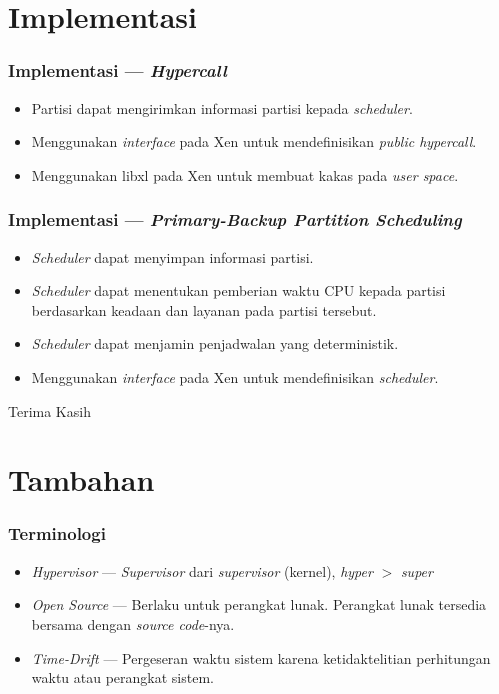 \documentclass[xetex]{beamer}
\begin{document}
\section{Implementasi}
\begin{frame}
	\frametitle{Implementasi --- \textit{Hypercall}}
	\begin{itemize}
		\item Partisi dapat mengirimkan informasi partisi kepada \textit{scheduler}.
		\item Menggunakan \textit{interface} pada Xen untuk mendefinisikan \textit{public hypercall}.
		\item Menggunakan libxl pada Xen untuk membuat kakas pada \textit{user space}.
	\end{itemize}
\end{frame}
\begin{frame}
	\frametitle{Implementasi --- \textit{Primary-Backup Partition Scheduling}}
	\begin{itemize}
		\item \textit{Scheduler} dapat menyimpan informasi partisi.
		\item \textit{Scheduler} dapat menentukan pemberian waktu CPU kepada partisi berdasarkan keadaan dan layanan pada partisi tersebut.
		\item \textit{Scheduler} dapat menjamin penjadwalan yang deterministik.
		\item Menggunakan \textit{interface} pada Xen untuk mendefinisikan \textit{scheduler}.
	\end{itemize}
\end{frame}
\begin{frame}[standout]
	\centering Terima Kasih
\end{frame}

\section{Tambahan}
\begin{frame}
	\frametitle{Terminologi}
	\begin{itemize}
		\item \textit{Hypervisor} --- \textit{Supervisor} dari \textit{supervisor} (kernel), \textit{hyper} $>$ \textit{super}
		\item \textit{Open Source} --- Berlaku untuk perangkat lunak. Perangkat lunak tersedia bersama dengan \textit{source code}-nya.
		\item \textit{Time-Drift} --- Pergeseran waktu sistem karena ketidaktelitian perhitungan waktu atau perangkat sistem.
	\end{itemize}
\end{frame}
\end{document}
